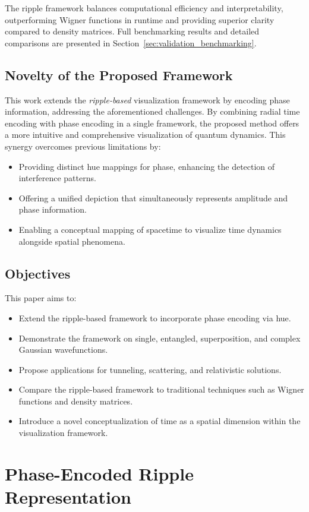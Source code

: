\documentclass[12pt]{article}
\begin{document}
The ripple framework balances computational efficiency and interpretability, outperforming Wigner functions in runtime and providing superior clarity compared to density matrices. Full benchmarking results and detailed comparisons are presented in Section~\ref{sec:validation_benchmarking}.

\subsection{Novelty of the Proposed Framework}
This work extends the \emph{ripple-based} visualization framework by encoding phase information, addressing the aforementioned challenges. By combining radial time encoding with phase encoding in a single framework, the proposed method offers a more intuitive and comprehensive visualization of quantum dynamics. This synergy overcomes previous limitations by:
\begin{itemize}
    \item Providing distinct hue mappings for phase, enhancing the detection of interference patterns.
    \item Offering a unified depiction that simultaneously represents amplitude and phase information.
    \item Enabling a conceptual mapping of spacetime to visualize time dynamics alongside spatial phenomena.
\end{itemize}

\subsection{Objectives}
This paper aims to:
\begin{itemize}
    \item Extend the ripple-based framework to incorporate phase encoding via hue.
    \item Demonstrate the framework on single, entangled, superposition, and complex Gaussian wavefunctions.
    \item Propose applications for tunneling, scattering, and relativistic solutions.
    \item Compare the ripple-based framework to traditional techniques such as Wigner functions and density matrices.
    \item Introduce a novel conceptualization of time as a spatial dimension within the visualization framework.
\end{itemize}

\section{Phase-Encoded Ripple Representation}
\end{document}
